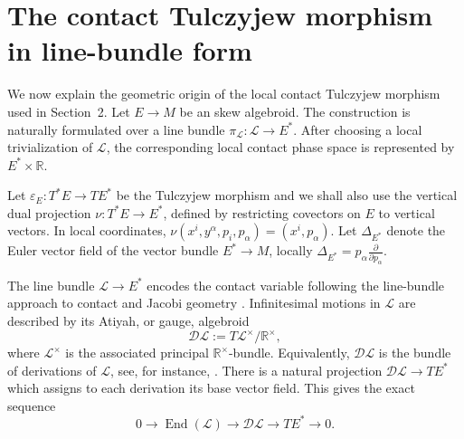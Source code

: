 \documentclass[11pt]{article}
\newtheorem{remark}[theorem]{Remark}
\newcommand{\R}{\mathbb{R}}
\newcommand{\Rtimes}{\mathbb{R}^{\times}}
\newcommand{\Lbundle}{\mathcal{L}}
\begin{document}


\section{The contact Tulczyjew morphism in line-bundle form}
\label{sec:intrinsic}

We now explain the geometric origin of the local contact Tulczyjew morphism used in
Section~2. Let \(E\to M\) be an skew algebroid. The construction is naturally formulated over a line bundle
$\pi_{\Lbundle}:\Lbundle\rightarrow E^*$. After choosing a local trivialization of \(\Lbundle\), the corresponding local
contact phase space is represented by \(E^*\times\R\).

 Let $\varepsilon_E:T^*E\rightarrow TE^{*}$
be the Tulczyjew morphism and we shall also use the
vertical dual projection $\nu:T^*E\rightarrow E^*$, defined by restricting covectors on \(E\) to vertical vectors. In local coordinates,
$\nu(x^i,y^\alpha,p_i,p_\alpha)=(x^i,p_\alpha)$. Let \(\Delta_{E^*}\) denote the Euler vector field of the vector bundle
\(E^*\to M\), locally $\Delta_{E^*}=p_\alpha\frac{\partial}{\partial p_\alpha}$.


The line bundle \(\Lbundle\to E^*\) encodes the contact variable following
the line-bundle approach to contact and Jacobi geometry
\cite{GG2024,BGG2017}. Infinitesimal
motions in \(\Lbundle\) are described
by its Atiyah, or gauge, algebroid
\[
\mathcal D\Lbundle:=T\Lbundle^\times/\Rtimes,
\]
where \(\Lbundle^\times\) is the associated principal \(\Rtimes\)-bundle.
Equivalently, \(\mathcal D\Lbundle\) is the bundle of derivations of
\(\Lbundle\), see, for instance, \cite{Vitagliano2016}. There is a natural projection
$\mathcal D\Lbundle\longrightarrow TE^{*}$
which assigns to each derivation its base vector field. This gives the exact
sequence
\[
0\longrightarrow \operatorname{End}(\Lbundle)
\longrightarrow \mathcal D\Lbundle
\longrightarrow TE^*
\longrightarrow 0.
\]
\end{document}
